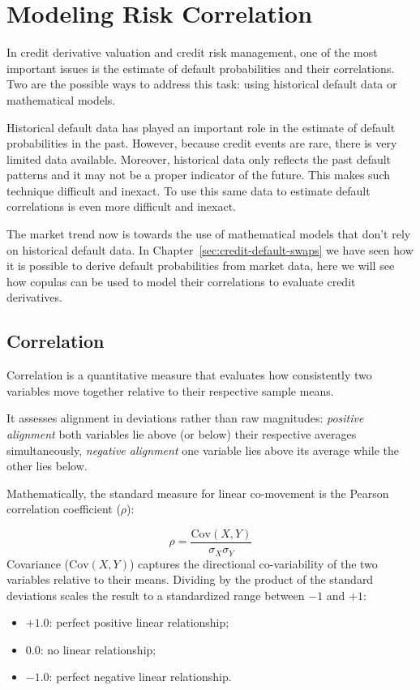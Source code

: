 \chapter{Modeling Risk Correlation}

In credit derivative valuation and credit risk management, one of the most important issues is the estimate of default probabilities and their correlations. Two are the possible ways to address this task: using historical default data or mathematical models.

Historical default data has played an important role in the estimate of default probabilities in the past. However, because credit events are rare, there is very limited data available. Moreover, historical data only reflects the past default patterns and it may not be a proper indicator of the future. This makes such technique difficult and inexact. To use this same data to estimate default correlations is even more difficult and inexact.

The market trend now is towards the use of mathematical models that don't rely on historical default data. In Chapter~\ref{sec:credit-default-swaps} we have seen how it is possible to derive default probabilities from market data, here we will see how copulas can be used to model their correlations to evaluate credit derivatives. 

\section{Correlation}
\label{sec:default_correlation}
Correlation is a quantitative measure that evaluates how consistently two variables move together relative to their respective sample means. 

It assesses alignment in deviations rather than raw magnitudes: \emph{positive alignment} both variables lie above (or below) their respective averages simultaneously, \emph{negative alignment} one variable lies above its average while the other lies below.

Mathematically, the standard measure for linear co-movement is the Pearson correlation coefficient ($\rho$):

$$\rho = \frac{\text{Cov}(X,Y)}{\sigma_X \sigma_Y}$$
Covariance ($\text{Cov}(X,Y)$) captures the directional co-variability of the two variables relative to their means. Dividing by the product of the standard deviations scales the result to a standardized range between $-1$ and $+1$:
\begin{itemize}
	\item $+1.0$: perfect positive linear relationship;
	\item $0.0$: no linear relationship;
	\item $-1.0$: perfect negative linear relationship.
\end{itemize}	

